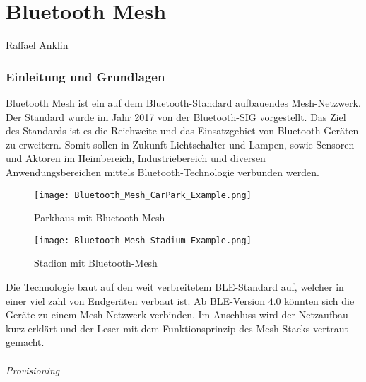 \vspace*{4cm}
\part{Bluetooth Mesh}\label{part:BluetoothMesh}
Raffael Anklin
\vspace*{\fill}
\clearpage

\section{Einleitung und Grundlagen}\label{sec:EinleitungBluetooth}


Bluetooth Mesh ist ein auf dem Bluetooth-Standard aufbauendes Mesh-Netzwerk. Der Standard wurde im Jahr 2017 von der Bluetooth-SIG vorgestellt. Das Ziel des Standards ist es die Reichweite und das Einsatzgebiet von Bluetooth-Geräten zu erweitern. Somit sollen in Zukunft Lichtschalter und Lampen, sowie Sensoren und Aktoren im Heimbereich, Industriebereich und diversen Anwendungsbereichen mittels Bluetooth-Technologie verbunden werden.  \\

\begin{figure}[!htbp]
	\begin{minipage}{0.49\textwidth}
		\centering
		\texttt{[image: Bluetooth\_Mesh\_CarPark\_Example.png]}
		\caption[Parkhaus mit Bluetooth-Mesh]{Parkhaus mit Bluetooth-Mesh \cite{bluetooth_sig_mesh-technology-overviewpdf_2020}}
		\label{fig:BluetoothMeshParkingExample}
	\end{minipage}
	\begin{minipage}{0.49\textwidth}
		\centering
		\texttt{[image: Bluetooth\_Mesh\_Stadium\_Example.png]}
		\caption[Stadion mit Bluetooth-Mesh]{Stadion mit Bluetooth-Mesh \cite{bluetooth_sig_mesh-technology-overviewpdf_2020}}
		\label{fig:BluetoothMeshStadiumExample}
	\end{minipage}
\end{figure}


Die Technologie baut auf den weit verbreitetem BLE-Standard auf, welcher in einer viel zahl von Endgeräten verbaut ist. Ab BLE-Version 4.0 könnten sich die Geräte zu einem Mesh-Netzwerk verbinden. Im Anschluss wird der Netzaufbau kurz erklärt und der Leser mit dem Funktionsprinzip des Mesh-Stacks vertraut gemacht. \\

\paragraph{Provisioning}

